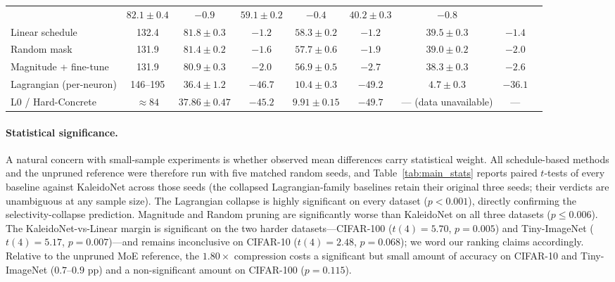 \documentclass[fleqn,10pt]{article}
\begin{document}
\begin{table}[t]
\begin{tabular}{lcccccccc}
 & $\mathbf{82.1\pm0.4}$ & $-0.9$
 & $\mathbf{59.1\pm0.2}$ & $-0.4$
 & $\mathbf{40.2\pm0.3}$ & $-0.8$ \\
Linear schedule                & 132.4
 & $81.8\pm0.3$ & $-1.2$
 & $58.3\pm0.2$ & $-1.2$
 & $39.5\pm0.3$ & $-1.4$ \\
Random mask                    & 131.9
 & $81.4\pm0.2$ & $-1.6$
 & $57.7\pm0.6$ & $-1.9$
 & $39.0\pm0.2$ & $-2.0$ \\
Magnitude + fine-tune          & 131.9
 & $80.9\pm0.3$ & $-2.0$
 & $56.9\pm0.5$ & $-2.7$
 & $38.3\pm0.3$ & $-2.6$ \\
\midrule
Lagrangian (per-neuron)        & 146--195
 & $36.4\pm1.2$ & $-46.7$
 & $10.4\pm0.3$ & $-49.2$
 & $4.7\pm0.3$  & $-36.1$ \\
L0 / Hard-Concrete\cite{louizos2018learning} & $\approx 84$
 & $37.86\pm0.47$ & $-45.2$
 & $9.91\pm0.15$ & $-49.7$
 & --- (data unavailable) & --- \\
\bottomrule
\end{tabular}
\end{table}

\paragraph{Statistical significance.}
A natural concern with small-sample experiments is whether observed
mean differences carry statistical weight. All schedule-based
methods and the unpruned reference were therefore run with five
matched random seeds, and Table~\ref{tab:main_stats} reports paired
$t$-tests of every baseline against KaleidoNet across those seeds
(the collapsed Lagrangian-family baselines retain their original
three seeds; their verdicts are unambiguous at any sample size).
The Lagrangian collapse is highly significant on every dataset
($p<0.001$), directly confirming the selectivity-collapse
prediction. Magnitude and Random pruning are significantly worse
than KaleidoNet on all three datasets ($p \leq 0.006$). The
KaleidoNet-vs-Linear margin is significant on the two harder
datasets---CIFAR-100 ($t(4){=}5.70$, $p{=}0.005$) and Tiny-ImageNet
($t(4){=}5.17$, $p{=}0.007$)---and remains inconclusive on CIFAR-10
($t(4){=}2.48$, $p{=}0.068$); we word our ranking claims
accordingly. Relative to the unpruned MoE reference, the
$1.80\times$ compression costs a significant but small amount of
accuracy on CIFAR-10 and Tiny-ImageNet ($0.7$--$0.9$ pp) and a
non-significant amount on CIFAR-100 ($p{=}0.115$).
\end{document}
